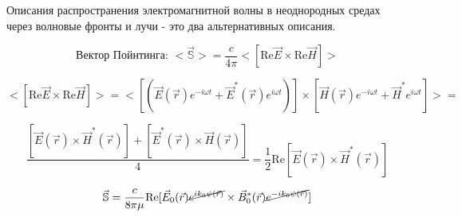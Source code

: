 \documentclass[12pt, a4paper]{report}
\begin{document}
Описания распространения электромагнитной волны в неоднородных средах через волновые фронты и лучи - это два альтернативных описания. 

\[ \text{Вектор Пойнтинга: }  <\vec{\mathbb{S}} >  = \frac{c }{4 \pi } <[\mathrm{Re } \vec{E } \times  \mathrm{Re } \vec{H }   ]>  \] 

\[  <[\mathrm{Re } \vec{E } \times  \mathrm{Re } \vec{H }   ]> = <[(\vec{E } (\vec{r } )e^{ -i \omega t}  + \vec{E } ^{* } (\vec{r } )e^{ i \omega t } )] \times [\vec{H }  (\vec{r } ) e^{- i \omega t } + \vec{H } ^{* } e^{ i \omega t }  ]> = \] 

\[ \frac{ [ \vec{E } (\vec{r } ) \times  \vec{H }^* ( \vec{r } ) ]+ [ \vec{E } ^{* } (\vec{r } )\times  \vec{H } (\vec{r } )]}{4} = \frac{1}{2 }  \mathrm{Re } [\vec{E } (\vec{r } ) \times  \vec{H } ^{ * } (\vec{r} )]   \] 

\[ \vec{\mathbb{S}} = \frac{c}{8 \pi \mu } \mathrm{Re } [\vec{E } _0 (\vec{r } )\cancel{e^{ i k_0 \psi (\vec{r} )} }\times \vec{B }_0 ^{* } (\vec{r } ) \cancel{e^{- i k_0 \psi (\vec{r} )} } ]    \] 


\ifdefined\mainfile
\else
    
\end{document}
